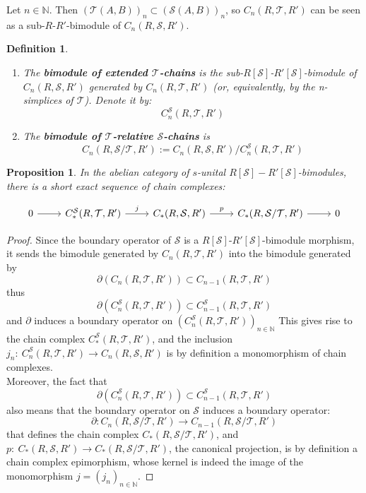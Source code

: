 \documentclass[a4paper,fleqn]{cas-sc}
\newtheorem{prop}[thm]{Proposition}%
\newtheorem{dfnt}{Definition}%
\def\N{\mathbb{N}}
\newcommand{\cS}{{\mathcal{S}}}
\newcommand{\cT}{{\mathcal{T}}}
\begin{document}
Let $n \in \mathbb{N}$. Then $(\cT(A,B))_n \subset (\cS(A,B))_n$, so $C_n(R, \cT, R')$ can be seen as a sub-$R$-$R'$-bimodule of $C_n(R, \cS, R')$.


\begin{dfnt}

\begin{enumerate}
    \item The \textbf{bimodule of extended $\cT$-chains} is the sub-$R[\cS]$-$R'[\cS]$-bimodule of $C_n(R, \cS, R')$ generated by $C_n(R, \cT, R')$ (or, equivalently, by the n-simplices of $\cT$). Denote it by:
    \[C^{\cS}_n(R, \cT, R')\]
 
    \item The \textbf{bimodule of  $\cT$-relative $\cS$-chains} is 
    \[C_n(R, \cS / \cT, R') := C_n(R, \cS, R'){/ C^{\cS}_n(R, \cT, R')}\]
\end{enumerate}
\end{dfnt}
 
 \begin{prop}
In the abelian category of $s$-unital $R[\cS]-R'[\cS]$-bimodules, there is a short exact sequence of chain complexes:

 \[\begin{tikzcd}
	0 & C^{\cS}_*(R, \cT, R') & C_*(R, \cS, R') & C_*(R, \cS/ \cT, R') & 0
	\arrow[from=1-1, to=1-2]
	\arrow["j", from=1-2, to=1-3]
	\arrow["p", from=1-3, to=1-4]
	\arrow[from=1-4, to=1-5]
\end{tikzcd}\]
 \end{prop}

\begin{proof}
Since the boundary operator of $\cS$ is a $R[\cS]$-$R'[\cS]$-bimodule morphism, it sends the bimodule generated by $C_n(R,\cT, R')$ into the bimodule generated by 
\[\partial \left( C_n(R,\cT, R')\right) \subset C_{n-1}(R,\cT, R')\]
thus 
\[\partial \left(C^{\cS}_n(R,\cT, R')\right) \subset
C^{\cS}_{n-1}(R,\cT, R')\]
and $\partial$ induces a boundary operator on 
$\left(
C^{\cS}_n(R,\cT, R')
\right)_{n \in \mathbb{N}}$
This gives rise to the chain complex $C^{\cS}_*(R, \cT, R')$, and the inclusion $j_n: \ C^{\cS}_n(R,\cT, R') \to C_n(R, \cS, R')$ is by definition a monomorphism of chain complexes.\\

Moreover, the fact that
\[\partial \left(C^{\cS}_n(R,\cT, R')\right) \subset
C^{\cS}_{n-1}(R,\cT, R')\]
also means that the boundary operator on $\cS$ induces a boundary operator:
\[
\partial: C_n(R, \cS/ \cT, R') \to C_{n-1}(R, \cS/ \cT, R')
\]
that defines the chain complex $C_*(R, \cS/ \cT, R')$, and 
$p: \ C_*(R, \cS, R') \to C_*(R, \cS/ \cT, R')$, the canonical projection, 
is by definition a chain complex epimorphism, whose kernel is indeed the image of the monomorphism $j=(j_n)_{n\in \N}$. %
\end{proof}
\end{document}
